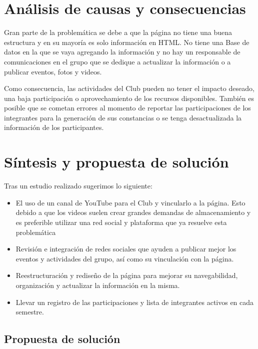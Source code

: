 \section{Análisis de causas y consecuencias}

	Gran parte de la problemática se debe a que la página no tiene una buena estructura y en su mayoría es solo información en HTML. No tiene una Base de datos en la que se vaya agregando la información y no hay un responsable de comunicaciones en el grupo que se dedique a actualizar la información o a publicar eventos, fotos y videos.
	
	Como consecuencia, las actividades del Club pueden no tener el impacto deseado, una baja participación o aprovechamiento de los recursos disponibles. También es posible que se cometan errores al momento de reportar las participaciones de los integrantes para la generación de sus constancias o se tenga desactualizada la información de los participantes.

\section{Síntesis y propuesta de solución}

	Tras un estudio realizado sugerimos lo siguiente:

\begin{itemize}
	\item El uso de un canal de YouTube para el Club y vincularlo a la página. Esto debido a que los videos suelen crear grandes demandas de almacenamiento y es preferible utilizar una red social y plataforma que ya resuelve esta problemática
	\item Revisión e integración de redes sociales que ayuden a publicar mejor los eventos y actividades del grupo, así como su vinculación con la página.
	\item Reestructuración y rediseño de la página para mejorar su navegabilidad, organización y actualizar la información en la misma.
	\item Llevar un registro de las participaciones y lista de integrantes activos en cada semestre.
\end{itemize}

\subsection{Propuesta de solución}

